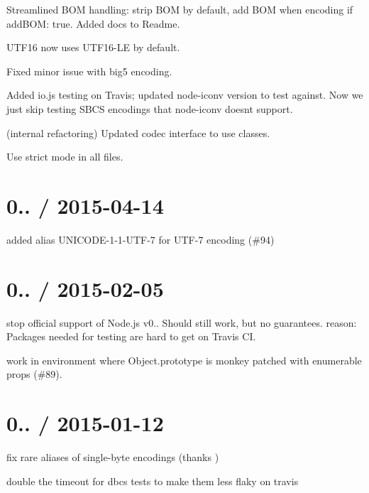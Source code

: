\begin{DoxyItemize}
\item Streamlined B\+OM handling\+: strip B\+OM by default, add B\+OM when encoding if add\+B\+OM\+: true. Added docs to Readme.
\item U\+T\+F16 now uses U\+T\+F16-\/\+LE by default.
\item Fixed minor issue with big5 encoding.
\item Added io.\+js testing on Travis; updated node-\/iconv version to test against. Now we just skip testing S\+B\+CS encodings that node-\/iconv doesn\textquotesingle{}t support.
\item (internal refactoring) Updated codec interface to use classes.
\item Use strict mode in all files.
\end{DoxyItemize}

\section*{0.. / 2015-\/04-\/14}


\begin{DoxyItemize}
\item added alias U\+N\+I\+C\+O\+D\+E-\/1-\/1-\/\+U\+T\+F-\/7 for U\+T\+F-\/7 encoding (\#94)
\end{DoxyItemize}

\section*{0.. / 2015-\/02-\/05}


\begin{DoxyItemize}
\item stop official support of Node.\+js v0.. Should still work, but no guarantees. reason\+: Packages needed for testing are hard to get on Travis CI.
\item work in environment where Object.\+prototype is monkey patched with enumerable props (\#89).
\end{DoxyItemize}

\section*{0.. / 2015-\/01-\/12}


\begin{DoxyItemize}
\item fix rare aliases of single-\/byte encodings (thanks )
\item double the timeout for dbcs tests to make them less flaky on travis
\end{DoxyItemize}

